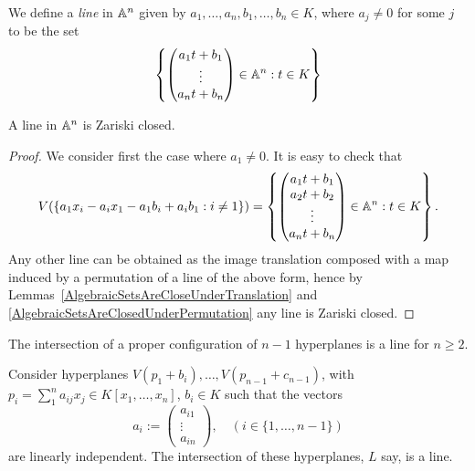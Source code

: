 \begin{definition}\label{GeneralDefinitionOfALine}
    We define a \textit{line} in $\mathbb{A}^n$ given by $a_1,\dots,a_n,b_1,\dots,b_n\in K$, where $a_j \neq 0$ for some $j$ to be the set 
    $$\left\{ \begin{pmatrix} a_1t + b_1\\ \vdots \\ a_nt+b_n \end{pmatrix}\in\mathbb{A}^n : t \in K \right\}$$
\end{definition}
\begin{lemma}\label{LineIsZariskiClosed}
    A line in $\mathbb{A}^n$ is Zariski closed. 
\end{lemma}
\begin{proof}
    We consider first the case where $a_1\neq0$. It is easy to check that 
    $$V(\{a_1x_i - a_ix_1-a_1b_i+a_ib_1 : i\neq 1\}) = \left\{ \begin{pmatrix} a_1t+b_1\\ a_2t+b_2\\ \vdots \\ a_nt+b_n \end{pmatrix}\in\mathbb{A}^n : t \in K \right\}.$$
    Any other line can be obtained as the image translation composed with a map induced by a permutation of a line of the above form, hence by Lemmas~\ref{AlgebraicSetsAreCloseUnderTranslation} and \ref{AlgebraicSetsAreClosedUnderPermutation} any line is Zariski closed.
\end{proof}
The intersection of a proper configuration of $n-1$ hyperplanes is a line for $n\geq 2$.
\begin{proposition}
    Consider hyperplanes $V(p_1+b_i),\dots,V(p_{n-1}+c_{n-1})$, with $p_i = \sum_1^n a_{ij}x_j\in K[x_1,\dots,x_n]$, $b_i\in K$ such that the vectors 
        $$a_i:=\begin{pmatrix}
            a_{i1}\\
            \vdots\\
            a_{in}
        \end{pmatrix}, \quad (i\in \{1,\dots,n-1\}) $$
    are linearly independent. The intersection of these hyperplanes, $L$ say, is a line.     
\end{proposition}

